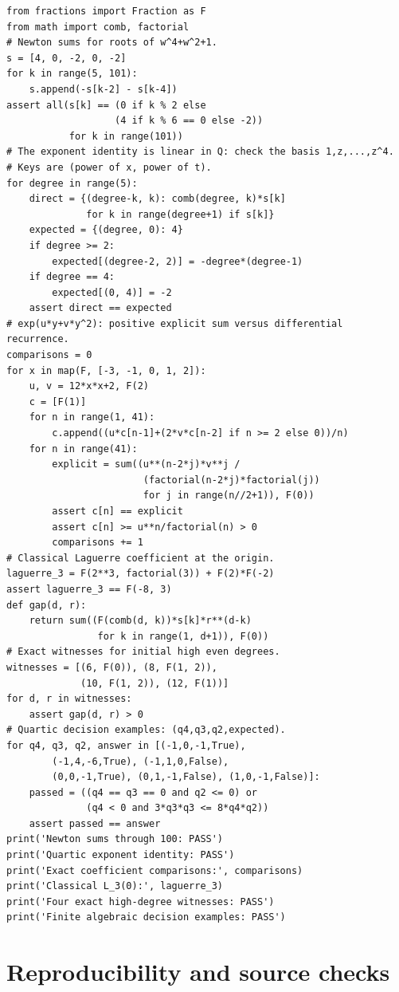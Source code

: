 \documentclass[11pt,a4paper]{article}
\theoremstyle{remark}\newtheorem{remark}[theorem]{Remark}
\begin{document}
\begin{lstlisting}
from fractions import Fraction as F
from math import comb, factorial
# Newton sums for roots of w^4+w^2+1.
s = [4, 0, -2, 0, -2]
for k in range(5, 101):
    s.append(-s[k-2] - s[k-4])
assert all(s[k] == (0 if k % 2 else
                   (4 if k % 6 == 0 else -2))
           for k in range(101))
# The exponent identity is linear in Q: check the basis 1,z,...,z^4.
# Keys are (power of x, power of t).
for degree in range(5):
    direct = {(degree-k, k): comb(degree, k)*s[k]
              for k in range(degree+1) if s[k]}
    expected = {(degree, 0): 4}
    if degree >= 2:
        expected[(degree-2, 2)] = -degree*(degree-1)
    if degree == 4:
        expected[(0, 4)] = -2
    assert direct == expected
# exp(u*y+v*y^2): positive explicit sum versus differential recurrence.
comparisons = 0
for x in map(F, [-3, -1, 0, 1, 2]):
    u, v = 12*x*x+2, F(2)
    c = [F(1)]
    for n in range(1, 41):
        c.append((u*c[n-1]+(2*v*c[n-2] if n >= 2 else 0))/n)
    for n in range(41):
        explicit = sum((u**(n-2*j)*v**j /
                        (factorial(n-2*j)*factorial(j))
                        for j in range(n//2+1)), F(0))
        assert c[n] == explicit
        assert c[n] >= u**n/factorial(n) > 0
        comparisons += 1
# Classical Laguerre coefficient at the origin.
laguerre_3 = F(2**3, factorial(3)) + F(2)*F(-2)
assert laguerre_3 == F(-8, 3)
def gap(d, r):
    return sum((F(comb(d, k))*s[k]*r**(d-k)
                for k in range(1, d+1)), F(0))
# Exact witnesses for initial high even degrees.
witnesses = [(6, F(0)), (8, F(1, 2)),
             (10, F(1, 2)), (12, F(1))]
for d, r in witnesses:
    assert gap(d, r) > 0
# Quartic decision examples: (q4,q3,q2,expected).
for q4, q3, q2, answer in [(-1,0,-1,True),
        (-1,4,-6,True), (-1,1,0,False),
        (0,0,-1,True), (0,1,-1,False), (1,0,-1,False)]:
    passed = ((q4 == q3 == 0 and q2 <= 0) or
              (q4 < 0 and 3*q3*q3 <= 8*q4*q2))
    assert passed == answer
print('Newton sums through 100: PASS')
print('Quartic exponent identity: PASS')
print('Exact coefficient comparisons:', comparisons)
print('Classical L_3(0):', laguerre_3)
print('Four exact high-degree witnesses: PASS')
print('Finite algebraic decision examples: PASS')
\end{lstlisting}

\section{Reproducibility and source checks}
\end{document}
